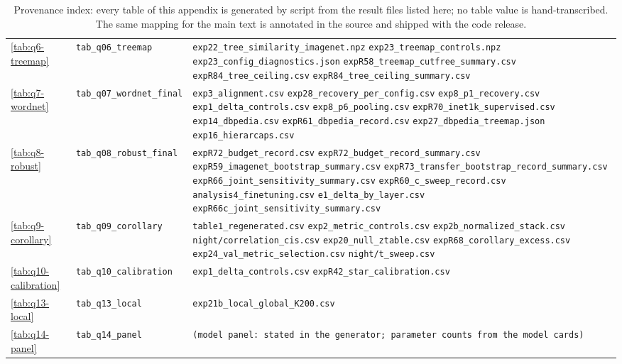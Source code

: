 \begin{table}[tbp]
\begin{tabular}{ll>{\raggedright\arraybackslash}p{9.0cm}}
\ref{tab:q6-treemap} & \texttt{tab\_q06\_treemap} & \texttt{exp22\_tree\_similarity\_imagenet.npz} \texttt{exp23\_treemap\_controls.npz} \texttt{exp23\_config\_diagnostics.json} \texttt{expR58\_treemap\_cutfree\_summary.csv} \texttt{expR84\_tree\_ceiling.csv} \texttt{expR84\_tree\_ceiling\_summary.csv} \\
\ref{tab:q7-wordnet} & \texttt{tab\_q07\_wordnet\_final} & \texttt{exp3\_alignment.csv} \texttt{exp28\_recovery\_per\_config.csv} \texttt{exp8\_p1\_recovery.csv} \texttt{exp1\_delta\_controls.csv} \texttt{exp8\_p6\_pooling.csv} \texttt{expR70\_inet1k\_supervised.csv} \texttt{exp14\_dbpedia.csv} \texttt{expR61\_dbpedia\_record.csv} \texttt{exp27\_dbpedia\_treemap.json} \texttt{exp16\_hierarcaps.csv} \\
\ref{tab:q8-robust} & \texttt{tab\_q08\_robust\_final} & \texttt{expR72\_budget\_record.csv} \texttt{expR72\_budget\_record\_summary.csv} \texttt{expR59\_imagenet\_bootstrap\_summary.csv} \texttt{expR73\_transfer\_bootstrap\_record\_summary.csv} \texttt{expR66\_joint\_sensitivity\_summary.csv} \texttt{expR60\_c\_sweep\_record.csv} \texttt{analysis4\_finetuning.csv} \texttt{e1\_delta\_by\_layer.csv} \texttt{expR66c\_joint\_sensitivity\_summary.csv} \\
\ref{tab:q9-corollary} & \texttt{tab\_q09\_corollary} & \texttt{table1\_regenerated.csv} \texttt{exp2\_metric\_controls.csv} \texttt{exp2b\_normalized\_stack.csv} \texttt{night/correlation\_cis.csv} \texttt{exp20\_null\_ztable.csv} \texttt{expR68\_corollary\_excess.csv} \texttt{exp24\_val\_metric\_selection.csv} \texttt{night/t\_sweep.csv} \\
\ref{tab:q10-calibration} & \texttt{tab\_q10\_calibration} & \texttt{exp1\_delta\_controls.csv} \texttt{expR42\_star\_calibration.csv} \\
\ref{tab:q13-local} & \texttt{tab\_q13\_local} & \texttt{exp21b\_local\_global\_K200.csv} \\
\ref{tab:q14-panel} & \texttt{tab\_q14\_panel} & \texttt{(model panel: stated in the generator; parameter counts from the model cards)} \\
\bottomrule
\end{tabular}
\caption{Provenance index: every table of this appendix is generated by script from the result files listed here; no table value is hand-transcribed. The same mapping for the main text is annotated in the source and shipped with the code release.}
\label{tab:provenance}
\end{table}
